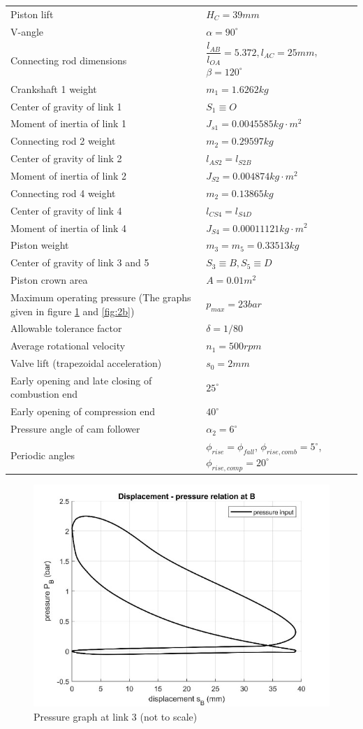 \begin{tabular}{p{9cm}p{6cm}}
	Piston lift & $ H_C=39\unit{mm} $\\
	V-angle&$ \alpha=90^\circ $\\
	Connecting rod dimensions  &$ \dfrac{l_{AB}}{l_{OA}} =5.372,l_{AC}=25mm$, $\beta=120^\circ$\\
	Crankshaft 1 weight&$ m_1=1.6262\unit{kg} $\\
	Center of gravity of link 1&$ S_1\equiv O $\\
	Moment of inertia of link 1&$ J_{s1}=0.0045585\unit{kg\cdot m^2} $\\
	Connecting rod 2 weight&$ m_2=0.29597\unit{kg} $\\
	Center of gravity of link 2&$ l_{AS2}=l_{S2B} $\\
	Moment of inertia of link 2&$ J_{S2}=0.004874\unit{kg\cdot m^2} $\\
	Connecting rod 4 weight&$ m_2=0.13865\unit{kg} $\\
	Center of gravity of link 4&$ l_{CS4}=l_{S4D} $\\
	Moment of inertia of link 4&$ J_{S4}=0.00011121\unit{kg\cdot m^2} $\\
	Piston weight&$ m_3=m_5=0.33513\unit{kg} $\\
	Center of gravity of link 3 and 5&$ S_3\equiv B, S_5\equiv D $\\
	Piston crown area&$ A=0.01\unit{m^2} $\\
	Maximum operating pressure (The graphs given in figure \ref{fig:2a} and \ref{fig:2b})&$ p_{max}=23\unit{bar} $\\
	Allowable tolerance factor&$ \delta=1/80 $\\
	Average rotational velocity&$ n_1=500\unit{rpm} $\\
	Valve lift (trapezoidal acceleration)&$ s_0=2\unit{mm} $ \\
	Early opening and late closing of combustion end&$ 25^\circ $\\
	Early opening of compression end&$ 40^\circ $\\
	Pressure angle of cam follower&$ \alpha_2=6^\circ $\\
	Periodic angles&$ \phi_{rise}=\phi_{fall}$, $\phi_{rise,comb}=5^\circ$, $\phi_{rise,comp}=20^\circ $
\end{tabular}
\begin{figure}
	\centering
	\includegraphics[width=0.7\linewidth]{2.2a}
	\caption{Pressure graph at link 3 (not to scale)}
	\label{fig:2a}
\end{figure}
